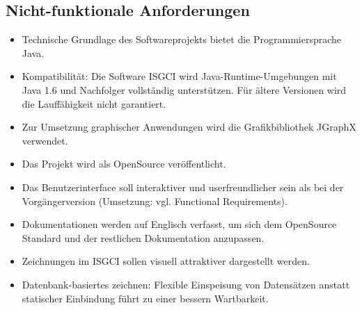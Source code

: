 \documentclass[11pt,a4paper]{article}
\begin{document}
	
	\subsection{Nicht-funktionale Anforderungen} %
		\begin{itemize}
		\item Technische Grundlage des Softwareprojekts bietet die Programmiersprache Java.
		\item Kompatibilität: Die Software ISGCI wird Java-Runtime-Umgebungen mit Java 1.6 und Nachfolger vollständig unterstützen. Für ältere Versionen wird die Lauffähigkeit nicht garantiert.
		\item Zur Umsetzung graphischer Anwendungen wird die Grafikbibliothek JGraphX verwendet.
		\item Das Projekt wird als OpenSource veröffentlicht.
		\item Das Benutzerinterface soll interaktiver und userfreundlicher sein als bei der Vorgängerversion (Umsetzung: vgl. Functional Requirements).
		\item Dokumentationen werden auf Englisch verfasst, um sich dem OpenSource Standard und der restlichen Dokumentation anzupassen.
		\item Zeichnungen im ISGCI sollen visuell attraktiver dargestellt werden.
		\item Datenbank-basiertes zeichnen: Flexible Einspeisung von Datensätzen anstatt statischer Einbindung führt zu einer bessern Wartbarkeit.
		\end{itemize}
		
\end{document}
